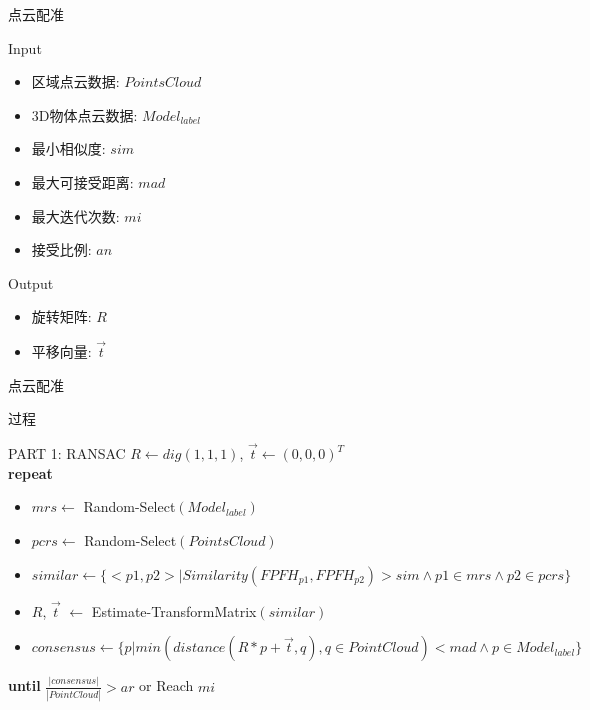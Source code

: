 \documentclass[xcolor=table,compress,blue]{beamer}
\begin{document}
	\begin{frame}{点云配准}
		\begin{exampleblock}{Input}
			\begin{itemize}		
				\item  区域点云数据: $Points Cloud$
				\item  3D物体点云数据: $Model_{label}$
				\item  最小相似度: $sim$
				\item  最大可接受距离: $mad$
				\item  最大迭代次数: $mi$ 
				\item  接受比例: $an$
			\end{itemize}
		\end{exampleblock}
		\begin{exampleblock}{Output}
			\begin{itemize}
				\item 旋转矩阵: $R$
				\item 平移向量: $\vec t$ 
			\end{itemize}
		\end{exampleblock}
	\end{frame}
	
	\begin{frame}{点云配准}
		\vspace{-9pt}
		\begin{exampleblock}{过程}
		\end{exampleblock}
		\vspace{-20pt}
		\begin{exampleblock}{\small{PART 1: RANSAC}}
			$R\leftarrow dig(1,1,1)$, $\vec t\leftarrow (0,0,0)^T$ 
			\\ \textbf{repeat} 
			\begin{itemize}
				\item $mrs \leftarrow $ Random-Select$(Model_{label})$
				\item $pcrs \leftarrow$ Random-Select$(Points Cloud)$
				\item $similar \leftarrow \{<p1,p2>|Similarity(FPFH_{p1},FPFH_{p2})>sim  \wedge p1 \in mrs \wedge p2 \in pcrs\}$
				\item $R$, $\vec t$ $\leftarrow$ Estimate-TransformMatrix$(similar)$
				\item $consensus \leftarrow \{p| min (distance(R*p+\vec t,q), q\in Point Cloud) < mad \wedge p \in Model_{label} \}$
			\end{itemize}
			\textbf{until} \quad $\frac{|consensus|}{|Point Cloud|} > ar$ or Reach $mi$
		\end{exampleblock}
	\end{frame}
	
\end{document}

